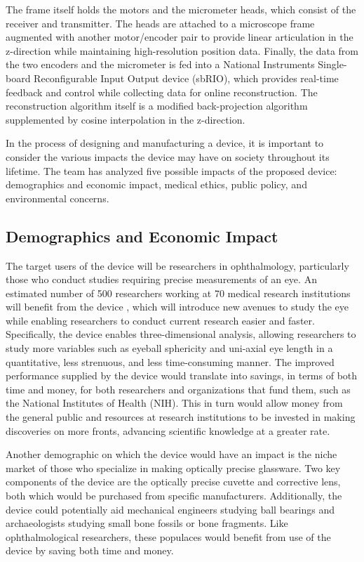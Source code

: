\documentclass{article}
\begin{document}
The frame itself holds the motors and the micrometer heads, which
consist of the receiver and transmitter. The heads are attached to a
microscope frame augmented with another motor/encoder pair to provide
linear articulation in the z-direction while maintaining
high-resolution position data. Finally, the data from the two encoders
and the micrometer is fed into a National Instruments Single-board
Reconfigurable Input Output device (sbRIO), which provides real-time
feedback and control while collecting data for online
reconstruction. The reconstruction algorithm itself is a modified
back-projection algorithm supplemented by cosine interpolation in the
z-direction.
 
In the process of designing and manufacturing a device, it is
important to consider the various impacts the device may have on
society throughout its lifetime. The team has analyzed five possible
impacts of the proposed device: demographics and economic impact,
medical ethics, public policy, and environmental concerns.
 
 
\subsection{Demographics and Economic Impact}
\label{sec:Demographics}
 
The target users of the device will be researchers in ophthalmology,
particularly those who conduct studies requiring precise measurements
of an eye. An estimated number of 500 researchers working at 70
medical research institutions will benefit from the device
\cite{Nickerson}, which will introduce new avenues to study the eye
while enabling researchers to conduct current research easier and
faster. Specifically, the device enables three-dimensional analysis,
allowing researchers to study more variables such as eyeball
sphericity and uni-axial eye length in a quantitative, less strenuous,
and less time-consuming manner. The improved performance supplied by
the device would translate into savings, in terms of both time and
money, for both researchers and organizations that fund them, such as
the National Institutes of Health (NIH). This in turn would allow money from the general public
and resources at research institutions to be invested in making
discoveries on more fronts, advancing scientific knowledge at a
greater rate.
 
Another demographic on which the device would have an impact is the
niche market of those who specialize in making optically precise
glassware. Two key components of the device are the optically precise
cuvette and corrective lens, both which would be purchased from
specific manufacturers. Additionally, the device could
potentially aid mechanical engineers studying ball bearings and
archaeologists studying small bone fossils or bone fragments. Like ophthalmological
researchers, these populaces would benefit from use of the device by saving both time and
money.
\end{document}
